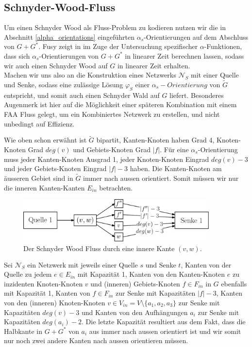 \subsection{Schnyder-Wood-Fluss}

Um einen Schnyder Wood als Fluss-Problem zu kodieren nutzen wir die in Abschnitt \ref{alpha_orientations} eingeführten $\alpha_s$-Orientierungen auf dem Abschluss von $G+G^*$. Fusy zeigt in \cite{fusy07} im Zuge der Untersuchung spezifischer $\alpha$-Funktionen, dass sich $\alpha_s$-Orientierungen von $G+G^*$ in linearer Zeit berechnen lassen, sodass wir auch einen Schnyder Wood auf $G$ in linearer Zeit erhalten.\\

Machen wir uns also an die Konstruktion eines Netzwerks $\mathcal{N}_S$ mit einer Quelle und Senke, sodass eine zulässige Lösung $\varphi_S$ einer $\alpha_s-Orientierung$ von $\tilde{G}$ entspricht, und somit auch einen Schnyder Wald auf $G$ liefert. Besonderes Augenmerk ist hier auf die Möglichkeit einer späteren Kombination mit einem FAA Fluss gelegt, um ein Kombiniertes Netzwerk zu erstellen, und nicht unbedingt auf Effizienz.\

Wie oben schon erwähnt ist $\tilde{G}$ bipartit, Kanten-Knoten haben Grad 4, Knoten-Knoten Grad $deg(v)$ und Gebiets-Knoten Grad $|f|$. Für eine $\alpha_s$-Orientierung muss jeder Kanten-Knoten Ausgrad 1, jeder Knoten-Knoten Eingrad $deg(v)-3$ und jeder Gebiets-Knoten Eingrad $|f|-3$ haben. Die Kanten-Knoten am äusseren Gebiet sind in $\tilde{G}$ immer nach aussen orientiert. Somit müssen wir nur die inneren Kanten-Kanten $E_{in}$ betrachten. \

\begin{figure}[h]
	\centering
  \includegraphics[width=0.9\textwidth]{schnyder_flow.png}
  \caption{Der Schnyder Wood Fluss durch eine innere Kante $(v,w)$.}
  \label{schnyder_flow}
\end{figure}

Sei $\mathcal{N}_S$ ein Netzwerk mit jeweils einer Quelle $s$ und Senke $t$, Kanten von der Quelle zu jedem $e \in E_{in}$ mit Kapazität 1, Kanten von den Kanten-Knoten $e$ zu inzidenten Knoten-Knoten $v$ und (inneren) Gebiets-Knoten $f \in F_{in}$ in $G$ ebenfalls mit Kapazität 1, Kanten von $f \in F_{in}$ zur Senke mit Kapazitäten $|f|-3$, Kanten von den (inneren) Knoten-Knoten $v \in V_{in} = V \setminus \{a_1,a_2,a_3\}$ zur Senke mit Kapazitäten $deg(v)-3$ und Kanten von den Aufhängungen $a_i$ zur Senke mit Kapazitäten $deg(a_i)-2$. Die letzte Kapazität resultiert aus dem Fakt, dass die Halbkante in $G+G^*$ von $a_i$ aus immer nach aussen orientiert ist und wir somit nur noch zwei andere Kanten nach aussen orientieren müssen.

